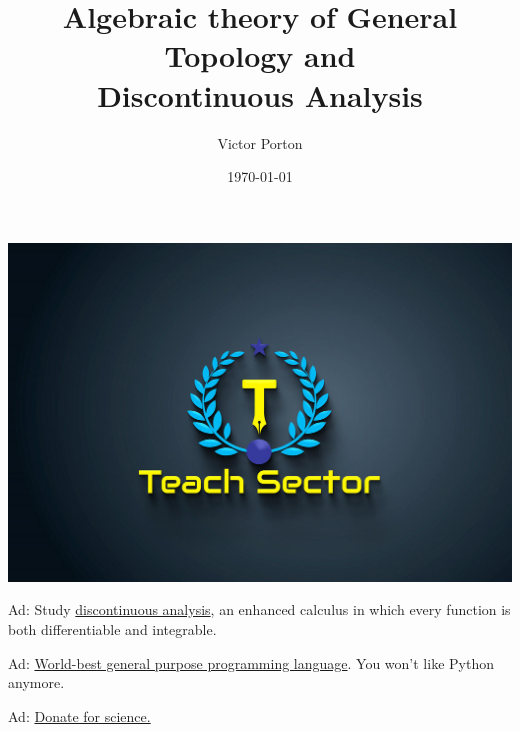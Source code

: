 \documentclass[a4paper,oneside,english,reqno]{amsbook}
\numberwithin{section}{chapter}
\let\noindent\empty %
\begin{document}
\noindent
\href{https://teachsector.com/limit/}{\includegraphics[scale=0.3]{img/Teach-Sector.jpeg}}

\noindent
Ad: Study \href{https://teachsector.com/limit/}{discontinuous analysis}, an enhanced
calculus in which every function is both differentiable and integrable.

\noindent
Ad: \href{https://teachsector.com/dforpython/}{World-best general purpose programming language}.
You won't like Python anymore.

\noindent
Ad: \href{https://science-dao.org}{Donate for science.}

\title{Algebraic theory of General Topology and\\Discontinuous Analysis}


\author{Victor Porton}






\date{\today}
\end{document}
